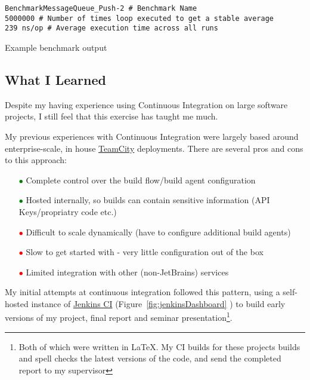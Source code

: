 \begin{listing}
  \centering
  \begin{verbatim}
BenchmarkMessageQueue_Push-2 # Benchmark Name
5000000 # Number of times loop executed to get a stable average
239 ns/op # Average execution time across all runs
  \end{verbatim}
  \caption{Example benchmark output}
  \label{lst:goBenchmarkOutput}
\end{listing}

\subsection{What I Learned}
\label{sub:What I Learned}

Despite my having experience using Continuous Integration on large software
projects, I still feel that this exercise has taught me much.

My previous experiences with Continuous Integration were largely based around
enterprise-scale, in house \href{https://www.jetbrains.com/teamcity/}{TeamCity}
deployments. There are several pros and cons to this approach:

\begin{itemize}
  \item[\textcolor{green}{$\bullet$}] Complete control over the build flow/build agent configuration
  \item[\textcolor{green}{$\bullet$}] Hosted internally, so builds can contain
  sensitive information (API Keys/propriatry code etc.)
  \item[\textcolor{red}{$\bullet$}] Difficult to scale dynamically
  (have to configure additional build agents)
  \item[\textcolor{red}{$\bullet$}] Slow to get started with - very little
  configuration out of the box
  \item[\textcolor{red}{$\bullet$}] Limited integration with other (non-JetBrains)
  services
\end{itemize}

My initial attempts at continuous integration followed this pattern, using
a self-hosted instance of \href{http://jenkins-ci.org/}{Jenkins CI}
(Figure~\ref{fig:jenkinsDashboard} ) to build early versions of my project,
final report and seminar presentation\footnote{Both of which were written in
\LaTeX. My CI builds for these projects builds and spell checks the latest
versions of the code, and send the completed report to my
supervisor}.

